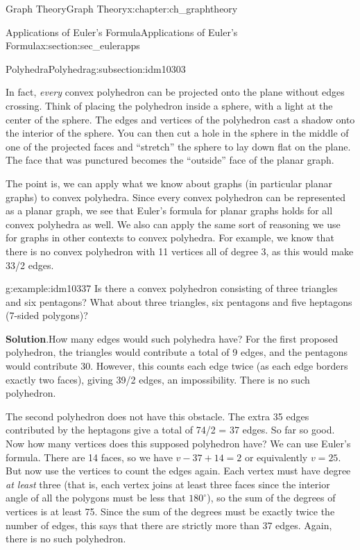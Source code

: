 \documentclass[oneside,10pt,]{book}
\numberwithin{equation}{chapter}
\begin{document}
\begin{chapterptx}{Graph Theory}{}{Graph Theory}{}{}{x:chapter:ch_graphtheory}
\begin{sectionptx}{Applications of Euler's Formula}{}{Applications of Euler's Formula}{}{}{x:section:sec_eulerapps}
\begin{subsectionptx}{Polyhedra}{}{Polyhedra}{}{}{g:subsection:idm10303}
\begin{sidebyside}{1}{0.4}{0.4}{0}
\begin{sbspanel}{0.2}
{}%
\end{sbspanel}%
\end{sidebyside}%
\par
In fact, \emph{every} convex polyhedron can be projected onto the plane without edges crossing. Think of placing the polyhedron inside a sphere, with a light at the center of the sphere. The edges and vertices of the polyhedron cast a shadow onto the interior of the sphere. You can then cut a hole in the sphere in the middle of one of the projected faces and ``stretch'' the sphere to lay down flat on the plane. The face that was punctured becomes the ``outside'' face of the planar graph.%
\par
The point is, we can apply what we know about graphs (in particular planar graphs) to convex polyhedra. Since every convex polyhedron can be represented as a planar graph, we see that Euler's formula for planar graphs holds for all convex polyhedra as well. We also can apply the same sort of reasoning we use for graphs in other contexts to convex polyhedra. For example, we know that there is no convex polyhedron with 11 vertices all of degree 3, as this would make 33\slash{}2 edges.%
\begin{example}{}{g:example:idm10337}%
Is there a convex polyhedron consisting of three triangles and six pentagons? What about three triangles, six pentagons and five heptagons (7-sided polygons)?%
\par\smallskip%
\noindent\textbf{Solution}.\hypertarget{g:solution:idm10340}{}\quad{}How many edges would such polyhedra have? For the first proposed polyhedron, the triangles would contribute a total of 9 edges, and the pentagons would contribute 30. However, this counts each edge twice (as each edge borders exactly two faces), giving 39\slash{}2 edges, an impossibility. There is no such polyhedron.%
\par
The second polyhedron does not have this obstacle. The extra 35 edges contributed by the heptagons give a total of 74\slash{}2 = 37 edges. So far so good. Now how many vertices does this supposed polyhedron have? We can use Euler's formula. There are 14 faces, so we have \(v - 37 + 14 = 2\) or equivalently \(v = 25\). But now use the vertices to count the edges again. Each vertex must have degree \emph{at least} three (that is, each vertex joins at least three faces since the interior angle of all the polygons must be less that \(180^\circ\)), so the sum of the degrees of vertices is at least 75. Since the sum of the degrees must be exactly twice the number of edges, this says that there are strictly more than 37 edges. Again, there is no such polyhedron.%

\end{example}
\end{subsectionptx}
\end{sectionptx}
\end{chapterptx}
\end{document}
